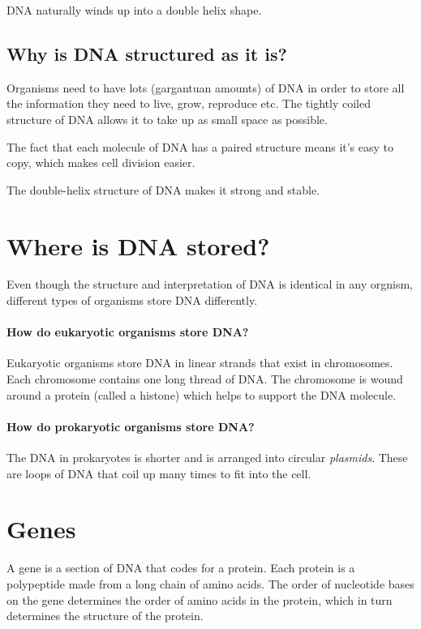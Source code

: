 \documentclass{article}
\begin{document}
DNA naturally winds up into a double helix shape.

\subsection*{Why is DNA structured as it is?}

Organisms need to have lots (gargantuan amounts) of DNA in order to store all
the information they need to live, grow, reproduce etc. The tightly coiled
structure of DNA allows it to take up as small space as possible.

The fact that each molecule of DNA has a paired structure means it's easy to
copy, which makes cell division easier.

The double-helix structure of DNA makes it strong and stable.

\section*{Where is DNA stored?}

Even though the structure and interpretation of DNA is identical in any orgnism,
different types of organisms store DNA differently.

\paragraph*{How do eukaryotic organisms store DNA?}


Eukaryotic organisms store DNA in linear strands that exist in chromosomes. Each
chromosome contains one long thread of DNA. The chromosome is wound around a
protein (called a histone) which helps to support the DNA molecule.

\paragraph*{How do prokaryotic organisms store DNA?}

The DNA in prokaryotes is shorter and is arranged into circular {\it plasmids}.
These are loops of DNA that coil up many times to fit into the cell.

\section*{Genes}

A gene is a section of DNA that codes for a protein. Each protein is a
polypeptide made from a long chain of amino acids. The order of nucleotide bases
on the gene determines the order of amino acids in the protein, which in turn
determines the structure of the protein.
\end{document}
